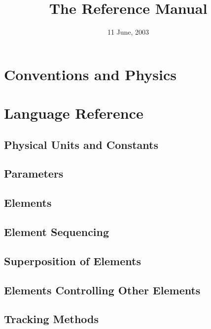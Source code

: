 \documentclass{book}
\begin{document}
\title{The \bmad Reference Manual}

\date{11 June, 2003}
\maketitle



\tableofcontents
\listoffigures
\listoftables

\part{Conventions and Physics}



\part{Language Reference}


\chapter{Physical Units and Constants}
\chapter{Parameters}
\chapter{Elements}
\chapter{Element Sequencing}
\chapter{Superposition of Elements}
\chapter{Elements Controlling Other Elements}
\chapter{Tracking Methods}
\end{document}
